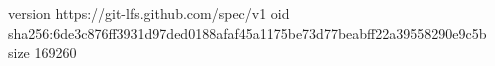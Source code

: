 version https://git-lfs.github.com/spec/v1
oid sha256:6de3c876ff3931d97ded0188afaf45a1175be73d77beabff22a39558290e9c5b
size 169260
